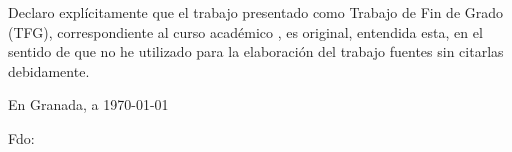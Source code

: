 %

\thispagestyle{empty}

\hfill\vfill
\vfill



Declaro explícitamente que el trabajo presentado como Trabajo de Fin de Grado (TFG), correspondiente al curso académico \miCurso, es original, entendida esta, en el sentido de que no he utilizado para la elaboración del trabajo fuentes sin citarlas debidamente.
\medskip

En Granada, a \today \\[4pt]
\begin{flushleft} 
Fdo: \miNombre 


\end{flushleft}

\vfill

\cleardoublepage
\endinput
